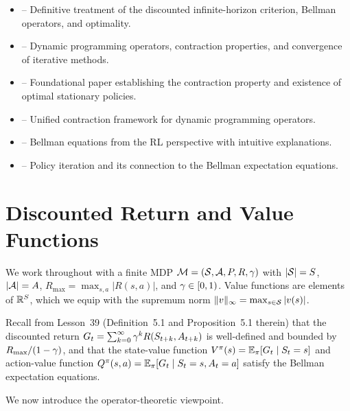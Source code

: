 \documentclass[11pt,a4paper]{article}
\begin{document}
\begin{itemize}
    \item \citet[Chapters 5--6]{puterman2014} -- Definitive treatment
    of the discounted infinite-horizon criterion, Bellman operators,
    and optimality.
    \item \citet[Chapter 1]{bertsekas2012} -- Dynamic programming
    operators, contraction properties, and convergence of iterative
    methods.
    \item \citet{blackwell1962} -- Foundational paper establishing
    the contraction property and existence of optimal stationary
    policies.
    \item \citet{denardo1967} -- Unified contraction framework for
    dynamic programming operators.
    \item \citet[Chapters 3--4]{suttonbarto2018} -- Bellman equations
    from the RL perspective with intuitive explanations.
    \item \citet{howard1960} -- Policy iteration and its connection to
    the Bellman expectation equations.
\end{itemize}


\section{Discounted Return and Value Functions}
\label{sec:discounted-return}

We work throughout with a finite MDP
$\mathcal{M} = (\mathcal{S}, \mathcal{A}, P, R, \gamma)$ with
$|\mathcal{S}| = S$, $|\mathcal{A}| = A$, $R_{\max} = \max_{s,a} |R(s,a)|$,
and $\gamma \in [0,1)$. Value functions are elements of $\mathbb{R}^S$,
which we equip with the supremum norm
$\|v\|_\infty = \max_{s \in \mathcal{S}} |v(s)|$.

Recall from Lesson~39 (Definition~5.1 and Proposition~5.1 therein)
that the discounted return
$G_t = \sum_{k=0}^\infty \gamma^k R(S_{t+k}, A_{t+k})$ is
well-defined and bounded by $R_{\max}/(1-\gamma)$, and that the
state-value function $V^{\pi}(s) = \mathbb{E}_\pi[G_t \mid S_t = s]$ and
action-value function
$Q^{\pi}(s,a) = \mathbb{E}_\pi[G_t \mid S_t = s, A_t = a]$ satisfy the
Bellman expectation equations.

We now introduce the operator-theoretic viewpoint.

\end{document}
